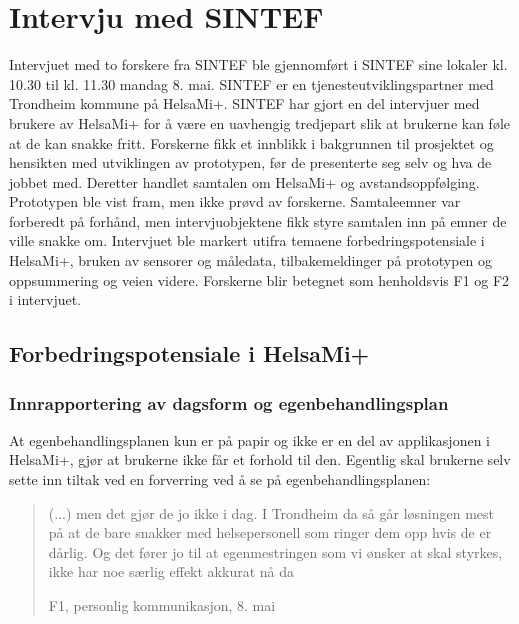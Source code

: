 
\section{Intervju med SINTEF}\label{intervju-med-sintef}
Intervjuet med to forskere fra SINTEF ble gjennomført i SINTEF sine lokaler
kl. 10.30 til kl. 11.30 mandag 8. mai. SINTEF er en tjenesteutviklingspartner med
Trondheim kommune på HelsaMi+. SINTEF har gjort en del intervjuer med brukere av
HelsaMi+ for å være en uavhengig tredjepart slik at brukerne kan føle at de kan snakke fritt.
Forskerne fikk et innblikk i bakgrunnen til prosjektet og hensikten med utviklingen av prototypen,
før de presenterte seg selv og hva de jobbet med. Deretter handlet samtalen om
HelsaMi+ og avstandsoppfølging. Prototypen ble vist fram, men ikke prøvd av
forskerne. Samtaleemner var forberedt på forhånd, men intervjuobjektene fikk styre samtalen inn på emner
de ville snakke om. Intervjuet ble markert utifra temaene forbedringspotensiale i HelsaMi+, bruken av
sensorer og måledata, tilbakemeldinger på prototypen og oppsummering og veien videre.
Forskerne blir betegnet som henholdsvis F1 og F2 i intervjuet.

\subsection{Forbedringspotensiale i HelsaMi+}

\subsubsection{Innrapportering av dagsform og egenbehandlingsplan}
At egenbehandlingsplanen kun er på papir og ikke er en del av applikasjonen i HelsaMi+, gjør at brukerne ikke
får et forhold til den. Egentlig skal brukerne selv sette inn tiltak ved en forverring ved å se på
egenbehandlingsplanen:
\blockquote[F1, personlig kommunikasjon, 8. mai]{(...) men det gjør de jo ikke i dag. I Trondheim da så går løsningen mest
    på at de bare snakker med helsepersonell som ringer dem opp hvis de
er dårlig. Og det fører jo til at egenmestringen som vi ønsker at skal styrkes, ikke har noe særlig effekt akkurat nå da}

